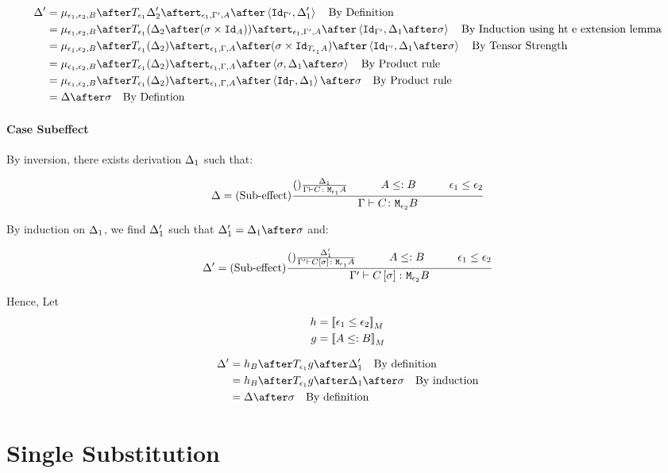 {    \begin{align}
        \D' & = \bind{\e_1}{\e_2}{B}\after\T{\e_1}{\D_2'}\after\tstrength{\e_1}{\G'}{A}\after\pr{\Id{\G'}}{\D_1'}\qt{By Definition}\\
        & = \bind{\e_1}{\e_2}{B}\after\T{\e_1}{(\D_2\after(\si\times\Id{A}))}\after\tstrength{\e_1}{\G'}{A}\after\pr{\Id{\G'}}{\D_1\after\si}\qt{By Induction using ht e extension lemma}\\
        & = \bind{\e_1}{\e_2}{B}\after\T{\e_1}{(\D_2)}\after\tstrength{\e_1}{\G}{A}\after(\si\times\Id{\T{\e_1}{A}})\after\pr{\Id{\G'}}{\D_1\after\si}\qt{By Tensor Strength}\\
        & = \bind{\e_1}{\e_2}{B}\after\T{\e_1}{(\D_2)}\after\tstrength{\e_1}{\G}{A}\after\pr{\si}{\D_1\after\si}\qt{By Product rule}\\
        & = \bind{\e_1}{\e_2}{B}\after\T{\e_1}{(\D_2)}\after\tstrength{\e_1}{\G}{A}\after\pr{\idg}{\D_1}\after\si\qt{By Product rule}\\
        &= \D\after\si\qt{By Defintion}\\
    \end{align}


    \paragraph{Case Subeffect}

    By inversion, there exists derivation $\Delta_1$ such that:

    \begin{equation}
        \D = \treerule{Sub-effect}{\treerule{}{\D_1}{\typerelation{\G}{C}{\M{\e_1}{A}}}\s\s A\subtype B\s\s \e_1\subeffect\e_2}{\typerelation{\G}{C}{\M{\e_2}{B}}}
    \end{equation}

    By induction on $\Delta_1$, we find $\Delta_1'$ such that $\D_1' = \D_1\after\si$ and:

    \begin{equation}
        \D' = \treerule{Sub-effect}{\treerule{}{\D_1'}{\typerelation{\G'}{C\ssi}{\M{\e_1}{A}}}\s\s A\subtype B\s\s \e_1\subeffect\e_2}{\typerelation{\G'}{C\ssi}{\M{\e_2}{B}}}
    \end{equation}

    Hence,
    Let
    \begin{align}
        h &= {\bf [\![}\epsilon_1\leq\epsilon_2{\bf ]\!]}_M\\
        g &= {\bf [\![}A\leq: B{\bf ]\!]}_M
    \end{align}

    \begin{align}
        \D' &= h_B\after\T{\e_1}{g}\after\D_1'\qt{By definition}\\
            &= h_B\after\T{\e_1}{g}\after\D_1\after\si\qt{By induction}\\
            &= \D\after\si\qt{By definition}\\
    \end{align}
    
    \section{Single Substitution}
}



\ifdefined\NoDocument
\else
\documentclass{report}


    \Substitution

\fi
